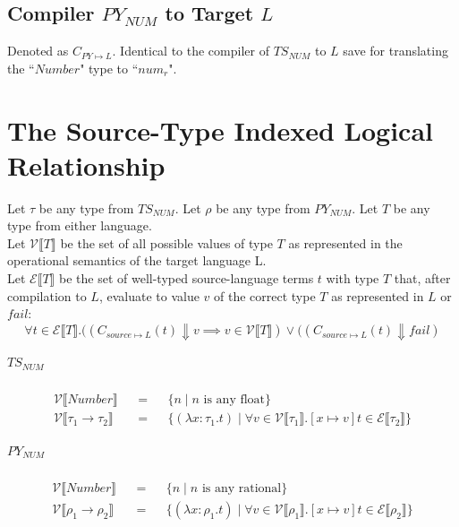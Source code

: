 \documentclass{article}
\newcommand{\makedenoteset}[3]{\mathcal{#1} \llbracket #2 \rrbracket && = && \{#3\}}
\newcommand{\denoteset}[2]{\mathcal{#1} \llbracket #2 \rrbracket}
\begin{document}
	\subsection{Compiler $PY_{NUM}$ to Target $L$}
		Denoted as $C_{PY \mapsto L}$. Identical to the compiler of $TS_{NUM}$ to $L$ save for translating the ``$Number$" type to ``$num_r$".

	\section{The Source-Type Indexed Logical Relationship}
	
	Let $\tau$ be any type from $TS_{NUM}$. Let $\rho$ be any type from $PY_{NUM}$. Let $T$ be any type from either language.\\
	
	Let $\denoteset{V}{T}$ be the set of all possible values of type $T$ as represented in the operational semantics of the target language L.\\
	
	Let $\denoteset{E}{T}$ be the set of well-typed source-language terms $t$ with type $T$ that, after compilation to $L$, evaluate to value $v$ of the correct type $T$ as represented in $L$ or $fail$:
	\[
		\forall t \in \denoteset{E}{T}. ((C_{source \mapsto L}(t) \Downarrow v \implies v \in \denoteset{V}{T}) \lor ((C_{source \mapsto L}(t) \Downarrow fail)
	\]

	
	\subparagraph{$TS_{NUM}$}
	\begin{align*}
		\makedenoteset{V}{Number}{n \mid n \text{ is any float}}\\
		\makedenoteset{V}{\tau_1 \rightarrow \tau_2}{
				(\lambda x\colon \tau_1.t)  \mid
				\forall v \in \denoteset{V}{\tau_1}.[x \mapsto v]t \in \denoteset{E}{\tau_2}
		}
	\end{align*}
	
	\subparagraph{$PY_{NUM}$}
	\begin{align*}
		\makedenoteset{V}{Number}{n \mid n \text{ is any rational}}\\
		\makedenoteset{V}{\rho_1 \rightarrow \rho_2}{
			(\lambda x: \rho_1.t) \mid
			\forall v \in \denoteset{V}{\rho_1}.[x \mapsto v]t \in \denoteset{E}{\rho_2}
		}
	\end{align*}
	
\end{document}
